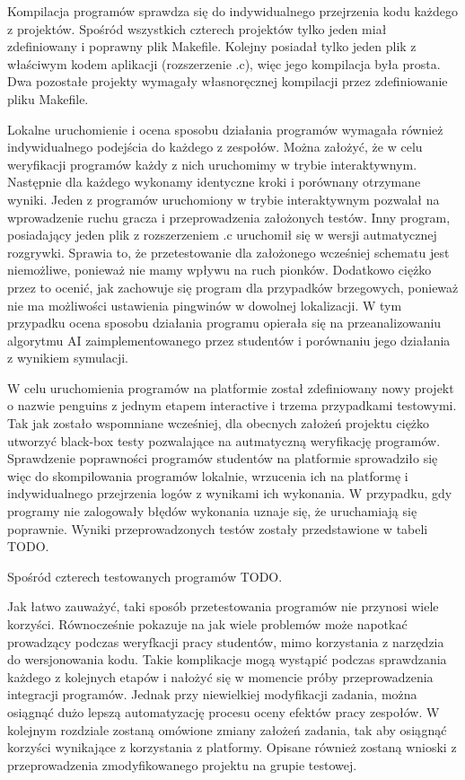 Kompilacja programów sprawdza się do indywidualnego przejrzenia kodu każdego z projektów.
Spośród wszystkich czterech projektów tylko jeden miał zdefiniowany i poprawny plik Makefile.
Kolejny posiadał tylko jeden plik z właściwym kodem aplikacji (rozszerzenie .c), więc jego kompilacja była prosta.
Dwa pozostałe projekty wymagały własnoręcznej kompilacji przez zdefiniowanie pliku Makefile.

Lokalne uruchomienie i ocena sposobu działania programów wymagała również indywidualnego podejścia do każdego z zespołów.
Można założyć, że w celu weryfikacji programów każdy z nich uruchomimy w trybie interaktywnym.
Następnie dla każdego wykonamy identyczne kroki i porównany otrzymane wyniki.
Jeden z programów uruchomiony w trybie interaktywnym pozwalał na wprowadzenie ruchu gracza i przeprowadzenia założonych testów.
Inny program, posiadający jeden plik z rozszerzeniem .c uruchomił się w wersji autmatycznej rozgrywki.
Sprawia to, że przetestowanie dla założonego wcześniej schematu jest niemożliwe, ponieważ nie mamy wpływu na ruch pionków.
Dodatkowo ciężko przez to ocenić, jak zachowuje się program dla przypadków brzegowych, ponieważ nie ma możliwości ustawienia pingwinów w dowolnej lokalizacji.
W tym przypadku ocena sposobu działania programu opierała się na przeanalizowaniu algorytmu AI zaimplementowanego przez studentów i porównaniu jego działania z wynikiem symulacji.

W celu uruchomienia programów na platformie został zdefiniowany nowy projekt o nazwie penguins z jednym etapem interactive i trzema przypadkami testowymi.
Tak jak zostało wspomniane wcześniej, dla obecnych założeń projektu ciężko utworzyć black-box testy pozwalające na autmatyczną weryfikację programów.
Sprawdzenie poprawności programów studentów na platformie sprowadziło się więc do skompilowania programów lokalnie, wrzucenia ich na platformę i indywidualnego przejrzenia logów z wynikami ich wykonania.
W przypadku, gdy programy nie zalogowały błędów wykonania uznaje się, że uruchamiają się poprawnie.
Wyniki przeprowadzonych testów zostały przedstawione w tabeli TODO.

Spośród czterech testowanych programów TODO.

Jak łatwo zauważyć, taki sposób przetestowania programów nie przynosi wiele korzyści.
Równocześnie pokazuje na jak wiele problemów może napotkać prowadzący podczas weryfkacji pracy studentów, mimo korzystania z narzędzia do wersjonowania kodu.
Takie komplikacje mogą wystąpić podczas sprawdzania każdego z kolejnych etapów i nałożyć się w momencie próby przeprowadzenia integracji programów.
Jednak przy niewielkiej modyfikacji zadania, można osiągnąć dużo lepszą automatyzację procesu oceny efektów pracy zespołów.
W kolejnym rozdziale zostaną omówione zmiany założeń zadania, tak aby osiągnąć korzyści wynikające z korzystania z platformy.
Opisane również zostaną wnioski z przeprowadzenia zmodyfikowanego projektu na grupie testowej.

